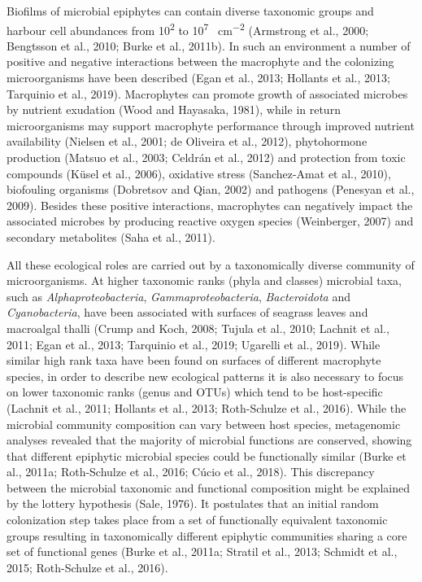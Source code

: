 \documentclass[
  12pt,
]{article}
\begin{document}
Biofilms of microbial epiphytes can contain diverse taxonomic groups and
harbour cell abundances from 10\textsuperscript{2} to
10\textsuperscript{7} \si{\cells\per\cm\squared} (Armstrong et al.,
2000; Bengtsson et al., 2010; Burke et al., 2011b). In such an
environment a number of positive and negative interactions between the
macrophyte and the colonizing microorganisms have been described (Egan
et al., 2013; Hollants et al., 2013; Tarquinio et al., 2019).
Macrophytes can promote growth of associated microbes by nutrient
exudation (Wood and Hayasaka, 1981), while in return microorganisms may
support macrophyte performance through improved nutrient availability
(Nielsen et al., 2001; de Oliveira et al., 2012), phytohormone
production (Matsuo et al., 2003; Celdrán et al., 2012) and protection
from toxic compounds (Küsel et al., 2006), oxidative stress
(Sanchez-Amat et al., 2010), biofouling organisms (Dobretsov and Qian,
2002) and pathogens (Penesyan et al., 2009). Besides these positive
interactions, macrophytes can negatively impact the associated microbes
by producing reactive oxygen species (Weinberger, 2007) and secondary
metabolites (Saha et al., 2011).

All these ecological roles are carried out by a taxonomically diverse
community of microorganisms. At higher taxonomic ranks (phyla and
classes) microbial taxa, such as \emph{Alphaproteobacteria},
\emph{Gammaproteobacteria}, \emph{Bacteroidota} and
\emph{Cyanobacteria}, have been associated with surfaces of seagrass
leaves and macroalgal thalli (Crump and Koch, 2008; Tujula et al., 2010;
Lachnit et al., 2011; Egan et al., 2013; Tarquinio et al., 2019;
Ugarelli et al., 2019). While similar high rank taxa have been found on
surfaces of different macrophyte species, in order to describe new
ecological patterns it is also necessary to focus on lower taxonomic
ranks (genus and OTUs) which tend to be host-specific (Lachnit et al.,
2011; Hollants et al., 2013; Roth-Schulze et al., 2016). While the
microbial community composition can vary between host species,
metagenomic analyses revealed that the majority of microbial functions
are conserved, showing that different epiphytic microbial species could
be functionally similar (Burke et al., 2011a; Roth-Schulze et al., 2016;
Cúcio et al., 2018). This discrepancy between the microbial taxonomic
and functional composition might be explained by the lottery hypothesis
(Sale, 1976). It postulates that an initial random colonization step
takes place from a set of functionally equivalent taxonomic groups
resulting in taxonomically different epiphytic communities sharing a
core set of functional genes (Burke et al., 2011a; Stratil et al., 2013;
Schmidt et al., 2015; Roth-Schulze et al., 2016).
\end{document}
